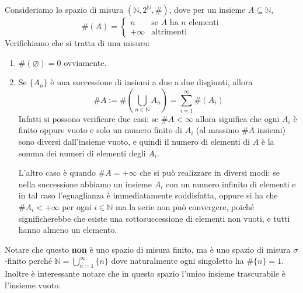 \begin{example}
    Consideriamo lo spazio di misura \((\mathbb{N}, 2^{\mathbb{N}}, \#)\), dove
    per un insieme \(A \subseteq \mathbb{N}\), 
    \[
        \#(A) = \begin{cases}
            n & \text{se } A \text{ ha } n \text{ elementi}\\
            +\infty & \text{altrimenti}
        \end{cases}
    \]
    Verifichiamo che si tratta di una misura:
    \begin{enumerate}[label = \arabic*.]
        \item \(\#(\varnothing) = 0\) ovviamente.
        \item Se \(\{A_{n}\} \) è una successione di insiemi a due a due
            disgiunti, allora \[\#A := \#\left(\bigcup_{n \in \mathbb{N}}
                A_{n}\right) = \sum_{i=1}^{\infty}
            \#(A_{i}) \]
            Infatti si possono verificare due casi: se \(\#A < \infty\) allora
            significa che ogni \(A_{i}\) è finito oppure vuoto e solo un numero
            finito di \(A_{i}\) (al massimo \(\#A\) insiemi) sono diversi
            dall'insieme vuoto, e quindi il numero di elementi di \(A\) è la
            somma dei numeri di elementi degli \(A_{i}\).

            L'altro caso è quando \(\#A = +\infty\) che si può realizzare in
            diversi modi: se nella successione abbiamo un insieme \(A_{i}\) con
            un numero infinito di elementi e in tal caso l'eguaglianza è
            immediatamente soddisfatta, oppure si ha che \(\#A_{i} < +\infty\)
            per ogni \(i \in \mathbb{N}\) ma la serie non può convergere, poiché
            significherebbe che esiste una sottosuccessione di elementi non
            vuoti, e tutti hanno almeno un elemento.
    \end{enumerate}

    Notare che questo \textbf{non} è uno spazio di misura finito, ma è uno
    spazio di misura \(\sigma\)-finito perché \(\mathbb{N} =
    \bigcup_{n=1}^\infty \{n\}\) dove naturalmente ogni singoletto ha \(\#\{n\}
    = 1\). Inoltre è interessante notare che in questo spazio l'unico insieme
    trascurabile è l'insieme vuoto.
\end{example}

